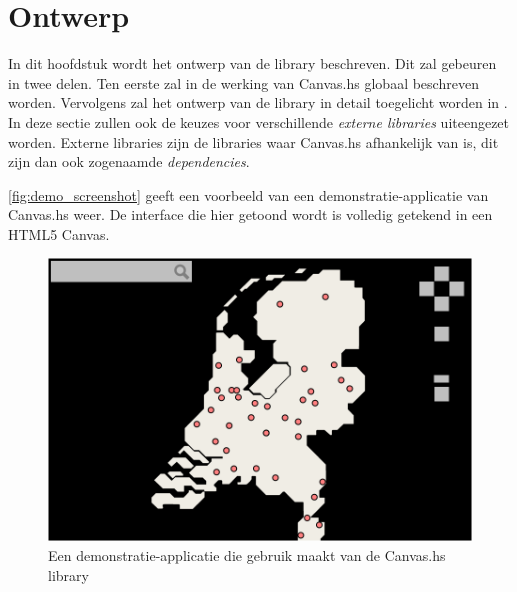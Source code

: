 \chapter{Ontwerp} \label{hoofdstuk:ontwerp}
In dit hoofdstuk wordt het ontwerp van de library beschreven. Dit zal gebeuren in twee delen. Ten eerste zal in  de werking van Canvas.hs globaal beschreven worden. 
Vervolgens zal het ontwerp van de library in detail toegelicht worden in . In deze sectie zullen ook de keuzes voor verschillende \emph{externe libraries} uiteengezet worden. Externe libraries zijn de libraries waar Canvas.hs afhankelijk van is, dit zijn dan ook zogenaamde \emph{dependencies}. 

 \autoref{fig:demo_screenshot} geeft een voorbeeld van een demonstratie-applicatie van Canvas.hs weer. De interface die hier getoond wordt is volledig getekend in een HTML5 Canvas.

\begin{figure}[H]
\begin{center}
\includegraphics[keepaspectratio,width=\textwidth]{./images/demo.png}
\caption{Een demonstratie-applicatie die gebruik maakt van de Canvas.hs library}
\label{fig:demo_screenshot}
\end{center}
\end{figure}


